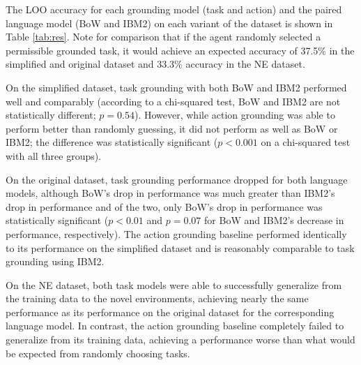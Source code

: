 \documentclass[conference]{IEEEtran}
\begin{document}
The LOO accuracy for each grounding model (task and action) and the paired language model (BoW and IBM2) on each variant of the dataset is shown in Table \ref{tab:res}. Note for comparison that if the agent randomly selected a permissible grounded task, it would achieve an expected accuracy of 37.5\% in the simplified and original dataset and 33.3\% accuracy in the NE dataset. 


On the simplified dataset, task grounding with both BoW and IBM2 performed well and comparably (according to a chi-squared test, BoW and IBM2 are not statistically different; $p = 0.54$). However, while action grounding was able to perform better than randomly guessing, it did not perform as well as BoW or IBM2; the difference was statistically significant ($p < 0.001$ on a chi-squared test with all three groups).

On the original dataset, task grounding performance dropped for both language models, although BoW's drop in performance was much greater than IBM2's drop in performance and of the two, only BoW's drop in performance was statistically significant ($p < 0.01$ and $p = 0.07$ for BoW and IBM2's decrease in performance, respectively). The action grounding baseline performed identically to its performance on the simplified dataset and is reasonably comparable to task grounding using IBM2.

On the NE dataset, both task models were able to successfully generalize from the training data to the novel environments, achieving nearly the same performance as its performance on the original dataset for the corresponding language model. In contrast, the action grounding baseline completely failed to generalize from its training data, achieving a performance worse than what would be expected from randomly choosing tasks.

\end{document}
